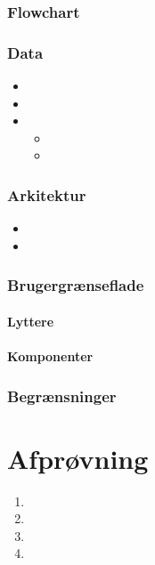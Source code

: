 \documentclass[final]{rapport1}
\begin{document}
\subsection{Flowchart}

\subsection{Data}
\begin{itemize}
\item 
\item
\item 
\begin{itemize}
\item 
\item 
\end{itemize}
\end{itemize}

\subsection{Arkitektur}
\begin{itemize}
\item 
\item 
\end{itemize}

\subsection{Brugergrænseflade}
\subsubsection{Lyttere}

\subsubsection{Komponenter}


\subsection{Begrænsninger}

\chapter{Afprøvning}

\begin{enumerate}
\item 
\item 
\item 
\item

\end{enumerate}
\end{document}
